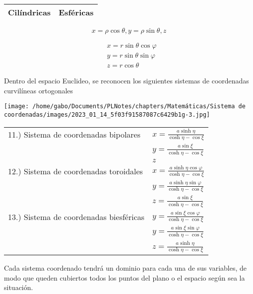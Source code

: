 \begin{center}
\begin{tabular}{|l|l|}
\hline
Cilíndricas & Esféricas \\
\hline
\end{tabular}
\end{center}

$$
x=\rho \cos \theta, y=\rho \sin \theta, z
$$

$$
\begin{aligned}
& x=r \sin \theta \cos \varphi \\
& y=r \sin \theta \sin \varphi \\
& z=r \cos \theta
\end{aligned}
$$

Dentro del espacio Euclideo, se reconocen los siguientes sistemas de coordenadas curvilíneas ortogonales

\begin{center}
\texttt{[image: /home/gabo/Documents/PLNotes/chapters/Matemáticas/Sistema de coordenadas/images/2023\_01\_14\_5f03f91587087c6429b1g-3.jpg]}
\end{center}

\begin{center}
\begin{tabular}{|l|l|}
\hline
11.) Sistema de coordenadas bipolares & $x=\frac{a \sinh \eta}{\cosh \eta-\cos \xi}$ \\
 & $y=\frac{a \sin \xi}{\cosh \eta-\cos \xi}$ \\
 & $z$ \\
\hline
12.) Sistema de coordenadas toroidales & $x=\frac{a \sinh \eta \cos \varphi}{\cosh \eta-\cos \xi}$ \\
 & $y=\frac{a \sinh \eta \sin \varphi}{\cosh \eta-\cos \xi}$ \\
 & $z=\frac{a \sin \xi}{\cosh \eta-\cos \xi}$ \\
\hline
13.) Sistema de coordenadas biesféricas & $y=\frac{a \sin \xi \cos \varphi}{\cosh \eta-\cos \xi}$ \\
 & $y=\frac{a \sin \xi \sin \varphi}{\cosh \eta-\cos \xi}$ \\
 & $z=\frac{a \sinh \eta}{\cosh \eta-\cos \xi}$ \\
\hline
\end{tabular}
\end{center}

Cada sistema coordenado tendrá un dominio para cada una de sus variables, de modo que queden cubiertos todos los puntos del plano o el espacio según sea la situación.


